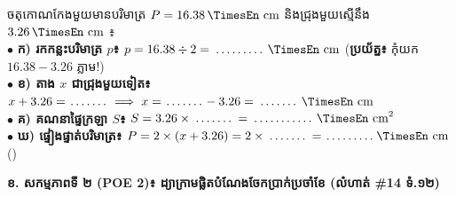 \documentclass[a4paper,10pt]{article}
\newcommand{\en}[1]{{\TimesEn #1}}
\newcommand{\unit}[1]{\,\text{\en{#1}}}
\newcommand{\cnum}[1]{\mbox{\fontsize{10pt}{12pt}\selectfont\ding{\numexpr181+#1\relax}}}
\newcommand{\blank}[1][1.5cm]{\makebox[#1]{\dotfill}}
\begin{document}
\begin{tcolorbox}[enhanced, sharp corners, colback=white, colframe=black, boxrule=0.7pt, boxsep=2pt, top=3pt, bottom=3pt, left=5pt, right=5pt]
  \begin{minipage}{13.1cm}
    ចតុកោណកែងមួយមានបរិមាត្រ $P = 16.38\unit{cm}$ និងជ្រុងមួយស្មើនឹង $3.26\unit{cm}$ ៖\\[3.5pt]
    $\bullet$ \textbf{ក) រកកន្លះបរិមាត្រ $p$៖} $p = 16.38 \div 2 = \blank[1.5cm]\unit{cm}$ (\textbf{ប្រយ័ត្ន៖} កុំយក $16.38-3.26$ ភ្លាម!)\\[3.5pt]
    $\bullet$ \textbf{ខ) តាង $x$ ជាជ្រុងមួយទៀត៖} $x + 3.26 = \blank[1.1cm] \implies x = \blank[1.1cm] - 3.26 = \blank[1.2cm]\unit{cm}$\\[3.5pt]
    $\bullet$ \textbf{គ) គណនាផ្ទៃក្រឡា $S$៖} $S = 3.26 \times \blank[1.2cm] = \blank[1.8cm]\unit{cm}^2$\\[3.5pt]
    $\bullet$ \textbf{ឃ) ផ្ទៀងផ្ទាត់បរិមាត្រ៖} $P = 2\times(x + 3.26) = 2\times\blank[1.2cm] = \blank[1.4cm]\unit{cm}$ (\cnum{5})
  \end{minipage}\hfill
  \begin{minipage}{4.4cm}
    \centering
  \end{minipage}
\end{tcolorbox}

\vspace{5pt}
\textbf{ខ. សកម្មភាពទី ២ (\en{POE 2})៖ ដ្យាក្រាមផ្លិតបំណែងចែកប្រាក់ប្រចាំខែ (លំហាត់ \#14 ទំ.១២)}
\end{document}
